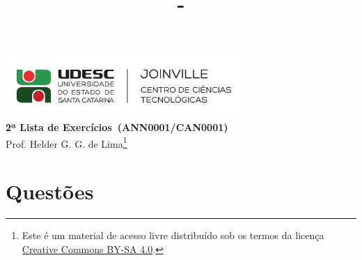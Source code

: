 \documentclass[12pt,a4paper]{article}
\author{\eu}
\title{\tipo - \disciplina}
\date{\data}
\newcommand{\IconPc}{\texttt{[image: computer.png]}}
\newcommand{\IconCalc}{\texttt{[image: calculator.png]}}
\newcommand{\IconThink}{\texttt{[image: pencil.png]}}
\newcommand{\IconCheck}{\texttt{[image: checkmark.png]}}
\newlength{\SmileysLength}
\newcommand{\calc}{\hspace*{-\SmileysLength}\makebox[0pt][r]{\IconCalc}%
   \hspace*{\SmileysLength}}
\newcommand{\software}{\hspace*{-\SmileysLength}\makebox[0pt][r]{\IconPc}%
   \hspace*{\SmileysLength}}
\newcommand{\teoria}{\hspace*{-\SmileysLength}\makebox[0pt][r]{\IconThink}%
   \hspace*{\SmileysLength}}
\newcommand{\conceito}{\hspace*{-\SmileysLength}\makebox[0pt][r]{\IconCheck}%
   \hspace*{\SmileysLength}}
\newcommand*\tipo{2ª Lista de Exercícios}
\newcommand*\disciplina{ANN0001/CAN0001}
\newcommand*\eu{Helder G. G. de Lima}
\begin{document}
\begin{center}
\includegraphics[width=9.0cm]{marca} \\
\textbf{\tipo\ (\disciplina)} \\
Prof. \eu\footnote{
Este é um material de acesso livre distribuído sob os termos da licença \href{https://creativecommons.org/licenses/by-sa/4.0/deed.pt_BR}{Creative Commons BY-SA 4.0}.}
\end{center}


\section*{Questões}
\end{document}
